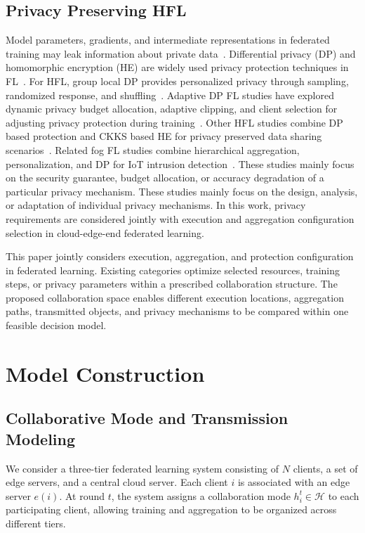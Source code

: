 \documentclass[5p,times]{elsarticle}
\theoremstyle{plain}
\theoremstyle{definition}
\theoremstyle{remark}
\begin{document}
\subsection{Privacy Preserving HFL}
Model parameters, gradients, and intermediate representations in federated
training may leak information about private data~\cite{zhu2019dlg}.
Differential privacy (DP) and homomorphic encryption (HE) are widely used
privacy protection techniques in FL~\cite{dwork2006calibrating,cheon2017ckks}.
For HFL, group local DP provides personalized privacy through sampling,
randomized response, and shuffling~\cite{GLDP}.
Adaptive DP FL studies have explored dynamic privacy budget allocation,
adaptive clipping, and client selection for adjusting privacy protection
during training~\cite{xu2025adpfl}.
Other HFL studies combine DP based protection and CKKS based HE for privacy
preserved data sharing scenarios~\cite{PPHFL}.
Related fog FL studies combine hierarchical aggregation, personalization, and DP
for IoT intrusion detection~\cite{islam2025pphffl}.
These studies mainly focus on the security guarantee, budget allocation, or
accuracy degradation of a particular privacy mechanism.
These studies mainly focus on the design, analysis, or adaptation of individual
privacy mechanisms. In this work, privacy requirements are considered jointly
with execution and aggregation configuration selection in cloud-edge-end
federated learning.

This paper jointly considers execution, aggregation, and protection
configuration in federated learning.
Existing categories optimize selected resources, training steps, or privacy
parameters within a prescribed collaboration structure. The proposed collaboration space enables different execution locations,
aggregation paths, transmitted objects, and privacy mechanisms to be compared
within one feasible decision model.
\section{Model Construction}
\label{sec:model}
\subsection{Collaborative Mode and Transmission Modeling}
\label{sec:link_model}

We consider a three-tier federated learning system
consisting of \(N\) clients, a set of edge servers,
and a central cloud server. Each client \(i\) is
associated with an edge server \(e(i)\). At round
\(t\), the system assigns a collaboration mode
\(h_i^t\in\mathcal H\) to each participating client,
allowing training and aggregation to be organized
across different tiers.
\end{document}
